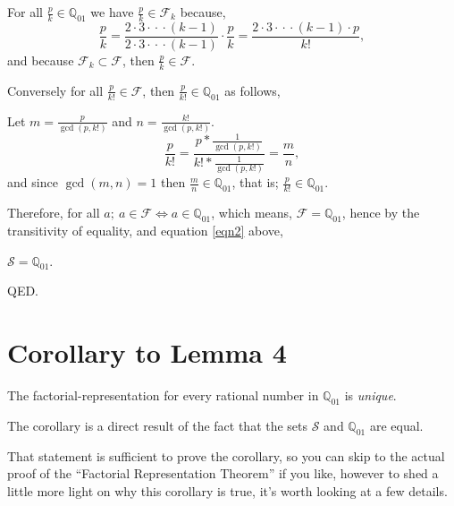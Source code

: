 \documentclass{article}
\begin{document}
For all \(\frac{p}{k} \in \mathbb{Q}_{01}\) we have
\(\frac{p}{k} \in{} \mathcal{F}_k\) because,
{\small
\bgroup                                  %
\begin{equation*}
\frac{p}{k}
= \frac{2\cdot{}3\cdot{}\cdot{}\cdot{}(k-1)}{2\cdot{}3\cdot{}\cdot{}\cdot{}(k-1)} \cdot{} \frac{p}{k}
= \frac{2\cdot{}3\cdot{}\cdot{}\cdot{}(k-1)\cdot{}p}{k!},
\end{equation*}
\egroup
}
and because \(\mathcal{F}_k \subset \mathcal{F}\), then \(\frac{p}{k} \in \mathcal{F}\).

Conversely for all \(\frac{p}{k!} \in \mathcal{F}\), then \(\frac{p}{k!} \in \mathbb{Q}_{01}\) as follows,

Let \(m = \frac{p}{\gcd(p,k!)}\)
and \(n = \frac{k!}{\gcd(p,k!)}\).
{\small
\bgroup                                  %
\setlength{\abovedisplayskip}{0pt}       %
\begin{equation*}
\frac{p}{k!} = \frac{p*\frac{1}{\gcd(p,k!)}}{k!*\frac{1}{\gcd(p,k!)}} = \frac{m}{n},
\end{equation*}
\egroup
}
and since \(\gcd(m,n) = 1\) then \(\frac{m}{n} \in \mathbb{Q}_{01}\), that is; \(\frac{p}{k!} \in \mathbb{Q}_{01}\).

Therefore, for all \(a;\ a \in \mathcal{F} \Leftrightarrow a \in \mathbb{Q}_{01}\), which means,
\(\mathcal{F} = \mathbb{Q}_{01}\),
hence by the transitivity of equality, and equation \eqref{eqn2} above,

\begin{center}
\(\mathcal{S} = \mathbb{Q}_{01}\).
\end{center}

QED.

\section*{Corollary to Lemma 4}

The factorial-representation for every rational number in \(\mathbb{Q}_{01}\) is \emph{unique}.

The corollary is a direct result of the fact that
the sets \(\mathcal{S}\) and \(\mathbb{Q}_{01}\) are equal.

That statement is sufficient to prove the corollary, so you can skip to
the actual proof of the ``Factorial Representation Theorem'' if you like, however
to shed a little more light on why this corollary is true, it's worth looking at a few details.
\end{document}
